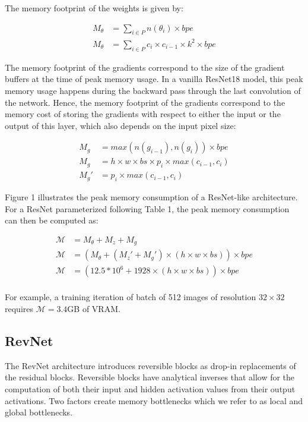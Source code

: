 \documentclass[twocolumn]{bmcart}
\begin{document}
The memory footprint of the weights is given by:

\begin{subequations}
\begin{align}
 M_{\theta} &= \sum_{i \in P}  n(\theta_i)\times bpe \\
 M_{\theta} &= \sum_{i \in P} c_i \times c_{i-1} \times k^2 \times bpe
\end{align}
\end{subequations}

The memory footprint of the gradients correspond to the size of the gradient buffers at the time of peak memory usage. In a vanilla ResNet18 model, this peak memory usage happens during the backward pass through the last convolution of the network.
Hence, the memory footprint of the gradients correspond to the memory cost of storing the gradients with respect to either the input or the output of this layer, which also depends on the input pixel size:

\begin{subequations}
\begin{align}
M_{g}  &= max(n(g_{i-1}), n(g_i)) \times bpe \\
M_{g}  &= h \times w \times bs \times p_i \times max(c_{i-1}, c_i) \\
M_{g}' &= p_i \times max(c_{i-1}, c_i)
\end{align}
\end{subequations}

Figure 1 illustrates the peak memory consumption of a ResNet-like architecture.
For a ResNet parameterized following Table 1, the peak memory consumption can then be computed as:

\begin{subequations}
\begin{align}
\mathcal{M} &= M_{\theta} + M_{z} + M_{g} \\
\mathcal{M} &= (M_{\theta} + (M_{z}' + M_{g}') \times (h \times w \times bs)) \times bpe \\
\mathcal{M} &= (12.5*10^6 + 1928 \times (h \times w \times bs)) \times bpe \\ 
\end{align}
\end{subequations}

For example, a training iteration of batch of 512 images of resolution $32 \times 32$ requires $\mathcal{M}=3.4$GB of VRAM.

\subsection{RevNet}
The RevNet architecture introduces reversible blocks as drop-in replacements of the residual blocks.
Reversible blocks have analytical inverses that allow for the computation of both their input and hidden activation values from their output activations.
Two factors create memory bottlenecks which we refer to as local and global bottlenecks.
\end{document}
